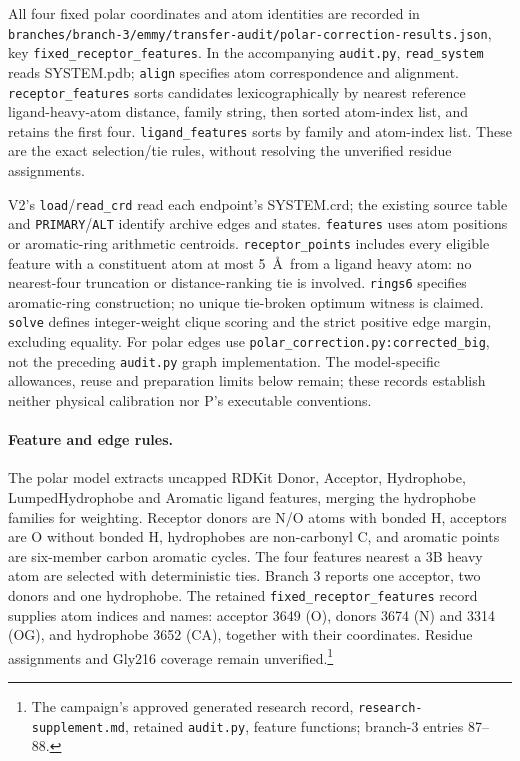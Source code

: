 \documentclass{article}
\newcommand{\rr}[1]{\footnote{The campaign's approved generated research record, \texttt{research-supplement.md}, #1.}}
\begin{document}
All four fixed polar coordinates and atom identities are recorded in \texttt{branches/branch-3/emmy/transfer-audit/polar-correction-results.json}, key \texttt{fixed\_receptor\_features}. In the accompanying \texttt{audit.py}, \texttt{read\_system} reads SYSTEM.pdb; \texttt{align} specifies atom correspondence and alignment. \texttt{receptor\_features} sorts candidates lexicographically by nearest reference ligand-heavy-atom distance, family string, then sorted atom-index list, and retains the first four. \texttt{ligand\_features} sorts by family and atom-index list. These are the exact selection/tie rules, without resolving the unverified residue assignments.

V2's \texttt{load}/\texttt{read\_crd} read each endpoint's SYSTEM.crd; the existing source table and \texttt{PRIMARY}/\texttt{ALT} identify archive edges and states. \texttt{features} uses atom positions or aromatic-ring arithmetic centroids. \texttt{receptor\_points} includes every eligible feature with a constituent atom at most 5~\AA\ from a ligand heavy atom: no nearest-four truncation or distance-ranking tie is involved. \texttt{rings6} specifies aromatic-ring construction; no unique tie-broken optimum witness is claimed. \texttt{solve} defines integer-weight clique scoring and the strict positive edge margin, excluding equality. For polar edges use \texttt{polar\_correction.py:corrected\_big}, not the preceding \texttt{audit.py} graph implementation. The model-specific allowances, reuse and preparation limits below remain; these records establish neither physical calibration nor P's executable conventions.


\paragraph{Feature and edge rules.}
The polar model extracts uncapped RDKit Donor, Acceptor, Hydrophobe, LumpedHydrophobe and Aromatic ligand features, merging the hydrophobe families for weighting. Receptor donors are N/O atoms with bonded H, acceptors are O without bonded H, hydrophobes are non-carbonyl C, and aromatic points are six-member carbon aromatic cycles. The four features nearest a 3B heavy atom are selected with deterministic ties. Branch 3 reports one acceptor, two donors and one hydrophobe. The retained \texttt{fixed\_receptor\_features} record supplies atom indices and names: acceptor 3649 (O), donors 3674 (N) and 3314 (OG), and hydrophobe 3652 (CA), together with their coordinates. Residue assignments and Gly216 coverage remain unverified.\rr{retained \texttt{audit.py}, feature functions; branch-3 entries 87--88}
\end{document}
